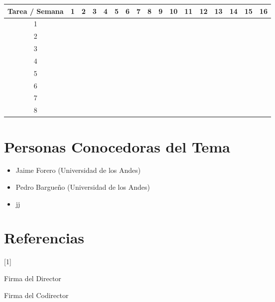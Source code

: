 \documentclass{article}
\begin{document}
\begin{table}[htb]

\begin{tabular}{|c||c|c|c|c|c|c|c|c|c|c|c|c|c|c|c|c| }

\hline
Tarea / Semana & 1 & 2 & 3 & 4 & 5 & 6 & 7 & 8 & 9 & 10 & 11 & 12 & 13 & 14 & 15 & 16  \\
\hline\hline
1 &   &   &   &   &   &   &   &   &   &   &   &   &   &   &   &  \\
\hline
2 &   &   &   &   &   &   &   &   &   &   &   &   &   &   &   &  \\
\hline
3 &   &   &   &   &   &   &   &   &   &   &   &   &   &   &   &  \\
\hline
4 &   &   &   &   &   &   &   &   &   &   &   &   &   &   &   &  \\
\hline
5 &   &   &   &   &   &   &   &   &   &   &   &   &   &   &   &  \\
\hline
6 &   &   &   &   &   &   &   &   &   &   &   &   &   &   &   &  \\
\hline
7 &   &   &   &   &   &   &   &   &   &   &   &   &   &   &   &  \\
\hline
8 &   &   &   &   &   &   &   &   &   &   &   &   &   &   &   &  \\
\hline

\end{tabular}

\end{table}

\section{Personas Conocedoras del Tema}

\begin{itemize}

\item Jaime Forero (Universidad de los Andes)
\item Pedro Bargueño (Universidad de los Andes)
\item jj

\end{itemize}


\section{Referencias}

[1] 


Firma del Director


Firma del Codirector
\end{document}
